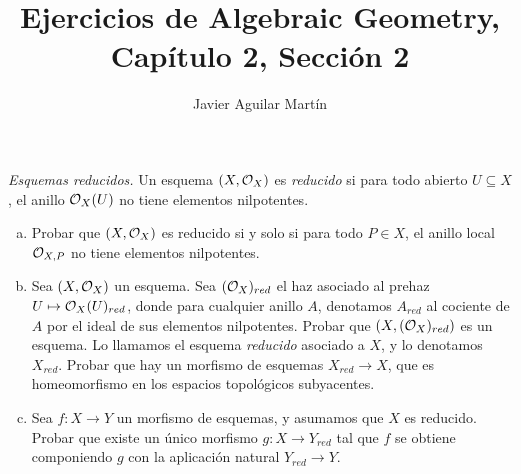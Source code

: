 \documentclass[twoside]{article}
\begin{document}
\title{Ejercicios de Algebraic Geometry, Capítulo 2, Sección 2}
\author{Javier Aguilar Martín}
\maketitle



%
%
%
%
%
%
%
%
\begin{ejercicio}{2.3}\emph{Esquemas reducidos.} Un esquema $(X,{\mathcal O}_X)$ es \emph{reducido} si para todo abierto $U\subseteq X$, el anillo ${\mathcal O}_X(U)$ no tiene elementos nilpotentes. 
\begin{enumerate}[(a)]
\item Probar que $(X,{\mathcal O}_X)$ es reducido si y solo si para todo $P\in X$, el anillo local ${\mathcal O}_{X,P}$ no tiene elementos nilpotentes. 
\item Sea $(X,{\mathcal O}_X)$ un esquema. Sea $({\mathcal O}_X)_{red}$ el haz asociado al prehaz $U\mapsto {\mathcal O}_X(U)_{red}$, donde para cualquier anillo $A$, denotamos $A_{red}$ al cociente de $A$ por el ideal de sus elementos nilpotentes. Probar que $(X, ({\mathcal O}_X)_{red})$ es un esquema. Lo llamamos el esquema \emph{reducido} asociado a $X$, y lo denotamos $X_{red}$. Probar que hay un morfismo de esquemas $X_{red}\to X$, que es homeomorfismo en los espacios topológicos subyacentes. 
\item Sea $f:X\to Y$ un morfismo de esquemas, y asumamos que $X$ es reducido. Probar que existe un único morfismo $g:X\to Y_{red}$ tal que $f$ se obtiene componiendo $g$ con la aplicación natural $Y_{red}\to Y$. 
\end{enumerate}


\end{ejercicio}
\end{document}
